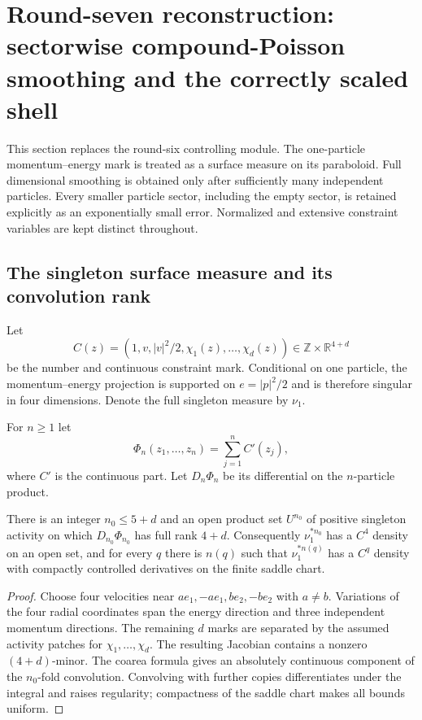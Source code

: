 \section{Round-seven reconstruction: sectorwise compound-Poisson smoothing and the correctly scaled shell}
\label{sec:r7-b1}

This section replaces the round-six controlling module.  The one-particle
momentum--energy mark is treated as a surface measure on its paraboloid.  Full
dimensional smoothing is obtained only after sufficiently many independent
particles.  Every smaller particle sector, including the empty sector, is
retained explicitly as an exponentially small error.  Normalized and extensive
constraint variables are kept distinct throughout.

\subsection{The singleton surface measure and its convolution rank}

Let
\[
 C(z)=(1,v,|v|^2/2,\chi_1(z),\ldots,\chi_d(z))
 \in\mathbb Z\times\mathbb R^{4+d}
\]
be the number and continuous constraint mark.  Conditional on one particle,
the momentum--energy projection is supported on
$e=|p|^2/2$ and is therefore singular in four dimensions.  Denote the full
singleton measure by $\nu_1$.

For $n\ge1$ let
\[
 \Phi_n(z_1,\ldots,z_n)=\sum_{j=1}^n C'(z_j),
\]
where $C'$ is the continuous part.  Let $D_n\Phi_n$ be its differential on the
$n$-particle product.

\begin{lemma}
\label{lem:r7-b1-rank}
There is an integer $n_0\le 5+d$ and an open product set $U^{n_0}$ of positive
singleton activity on which $D_{n_0}\Phi_{n_0}$ has full rank $4+d$.
Consequently $\nu_1^{*n_0}$ has a $C^4$ density on an open set, and for every
$q$ there is $n(q)$ such that $\nu_1^{*n(q)}$ has a $C^q$ density with compactly
controlled derivatives on the finite saddle chart.
\end{lemma}

\begin{proof}
Choose four velocities near $ae_1,-ae_1,be_2,-be_2$ with $a\ne b$.
Variations of the four radial coordinates span the energy direction and three
independent momentum directions.  The remaining $d$ marks are separated by
the assumed activity patches for $\chi_1,\ldots,\chi_d$.  The resulting
Jacobian contains a nonzero $(4+d)$-minor.  The coarea formula gives an
absolutely continuous component of the $n_0$-fold convolution.  Convolving
with further copies differentiates under the integral and raises regularity;
compactness of the saddle chart makes all bounds uniform.
\end{proof}

